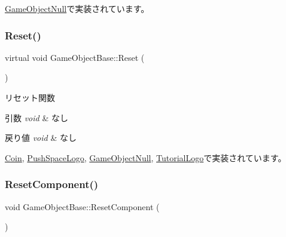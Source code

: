 \mbox{\hyperlink{class_game_object_null_abc4e2c2ce54fb3d0bc3f0b45149a66cb}{Game\+Object\+Null}}で実装されています。

\mbox{\label{class_game_object_base_a85c59554f734bcb09f1a1e18d9517dce}} 
\subsubsection{\texorpdfstring{Reset()}{Reset()}}
{\footnotesize\ttfamily virtual void Game\+Object\+Base\+::\+Reset (\begin{DoxyParamCaption}{ }\end{DoxyParamCaption})\hspace{0.3cm}{\ttfamily [pure virtual]}}



リセット関数 


\begin{DoxyParams}{引数}
{\em void} & なし \\
\hline
\end{DoxyParams}

\begin{DoxyRetVals}{戻り値}
{\em void} & なし \\
\hline
\end{DoxyRetVals}


\mbox{\hyperlink{class_coin_a52c50229ce7c1e0f459e198adac70c8d}{Coin}}, \mbox{\hyperlink{class_push_space_logo_afa163b1aff8df494b4f09f378bf983f0}{Push\+Space\+Logo}}, \mbox{\hyperlink{class_game_object_null_a26a748e17ea31b987249022562f5198c}{Game\+Object\+Null}}, \mbox{\hyperlink{class_tutorial_logo_a2c9e22c81cfeafbd34f50cc766a66cf1}{Tutorial\+Logo}}で実装されています。

\mbox{\label{class_game_object_base_ae68b93e50540bf41a81d88ca508b2b4d}} 
\subsubsection{\texorpdfstring{Reset\+Component()}{ResetComponent()}}
{\footnotesize\ttfamily void Game\+Object\+Base\+::\+Reset\+Component (\begin{DoxyParamCaption}{ }\end{DoxyParamCaption})\hspace{0.3cm}{\ttfamily [protected]}}




